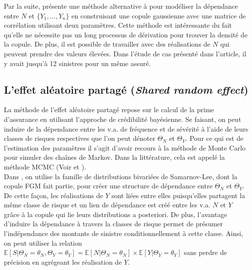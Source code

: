 \documentclass{article}
\begin{document}
	Par la suite, \cite{oh2019copula} présente une méthode alternative à \cite{Itre5} pour modéliser la dépendance entre $N$ et $\{Y_1,\dots,Y_n\}$ en construisant une copule gaussienne avec une matrice de corrélation utilisant deux paramètres. Cette méthode est intéressante du fait qu'elle ne nécessite pas un long processus de dérivation pour trouver la densité de la copule. De plus, il est possible de travailler avec des réalisations de $N$ qui peuvent prendre des valeurs élevées. Dans l'étude de cas présenté dans l'article, il y avait jusqu'à 12 sinistres pour un même assuré.%
	

	\subsection{L'effet aléatoire partagé (\textit{Shared random effect})}
	La méthode de l'effet aléatoire partagé repose sur le calcul de la prime d'assurance en utilisant l'approche de crédibilité bayésienne. Se faisant, on peut induire de la dépendance entre les v.a. de fréquence et de sévérité à l'aide de leurs classes de risques respectives que l'on peut dénoter $\Theta_N$ et $\Theta_Y$. Pour ce qui est de l'estimation des paramètres il s'agit d'avoir recours à la méthode de Monte Carlo pour simuler des chaînes de Markov. Dans la littérature, cela est appelé la méthode MCMC (Voir \cite{brooks2011handbook} et \cite{roberts2004general}).\\
	
	Dans \cite{hernandez2009net}, on utilise la famille de distributions bivariées de Samarnov-Lee, dont la copule FGM fait partie, pour créer une structure de dépendance entre $\Theta_N$ et $\Theta_Y$. De cette façon, les réalisations de $Y$ sont liées entre elles puisqu'elles partagent la même classe de risque et un lien de dépendance est créé entre les v.a. $N$ et $Y$ grâce à la copule qui lie leurs distributions a posteriori. De plus, l'avantage d'induire la dépendance à travers la classes de risque permet de présumer l'indépendance des montants de sinistre conditionnellement à cette classe. Ainsi, on peut utiliser la relation $\mathbb{E}[S|\Theta_N=\theta_N, \Theta_Y=\theta_Y]  = \mathbb{E}[N|\Theta_N=\theta_N] \times \mathbb{E}[Y|\Theta_Y=\theta_Y]$ sans perdre de précision en agrégeant les réalisation de $Y$.\\
	
\end{document}

